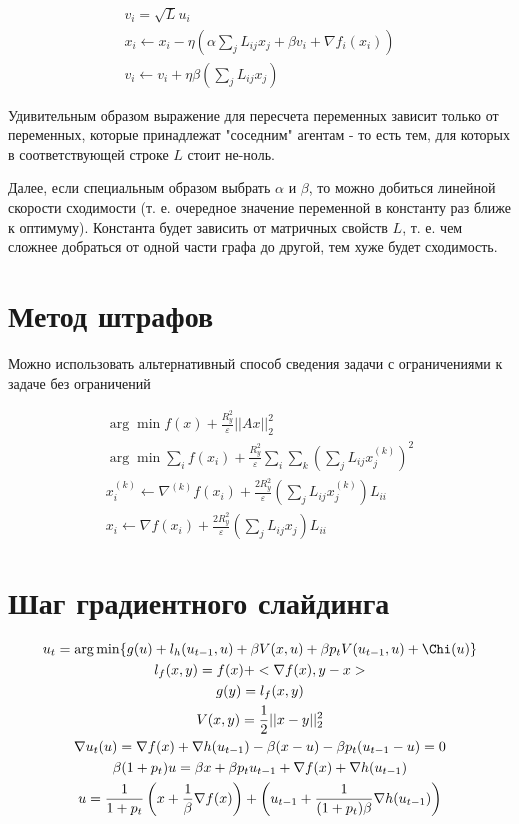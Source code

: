 \documentclass[a4paper, 10pt]{article}
\begin{document}
\begin{gather}
    v_i = \sqrt{L} u_i \\
    x_{i} \leftarrow x_i - \eta(\alpha\sum_{j} L_{ij} x_{j} + \beta v_i + \nabla f_i(x_i)) \\
    v_{i} \leftarrow v_i + \eta\beta(\sum_j L_{ij}x_j)
\end{gather}


Удивительным образом выражение для пересчета переменных зависит только от переменных, которые принадлежат "соседним" агентам - то есть тем, для которых в соответствующей строке $L$ стоит не-ноль.

Далее, если специальным образом выбрать $\alpha$ и $\beta$, то можно добиться линейной скорости сходимости (т. е. очередное значение переменной в константу раз ближе к оптимуму). Константа будет зависить от матричных свойств $L$, т. е. чем сложнее добраться от одной части графа до другой, тем хуже будет сходимость.

\section{Метод штрафов}

Можно использовать альтернативный способ сведения задачи с ограничениями к задаче без ограничений

\begin{gather}
    \arg \min f(x) + \frac{R_y^2}{\varepsilon} ||Ax||^2_2 \\ 
    \arg \min \sum_i f(x_i) + \frac{R_y^2}{\varepsilon} \sum_i \sum_k \left(\sum_j L_{ij} x_j^{(k)}\right)^2 \\ 
    x_i^{(k)} \leftarrow \nabla^{(k)} f(x_i) + \frac{2R_y^2}{\varepsilon} 
        \left(\sum_j L_{ij} x_j^{(k)} \right)L_{ii} \\
    x_i \leftarrow \nabla f(x_i) + \frac{2R_y^2}{\varepsilon} 
        \left(\sum_j L_{ij} x_j \right)L_{ii}
\end{gather}

\section{Шаг градиентного слайдинга}
\begin{gather}
    u_t  = \arg \min \{g(u) + l_h(u_{t-1}, u) + \beta V(x, u) + 
    \beta p_t V(u_{t-1}, u) + \Chi(u) \} \\
    l_f(x,y) = f(x) + <\nabla f(x), y-x> \\
    g(y) = l_f(x, y) \\
    V(x, y) = \frac{1}{2} ||x-y||_2^2 \\
    \nabla u_t(u) = \nabla f(x) + \nabla h(u_{t-1}) - \beta (x - u) - \beta p_t (u_{t-1} - u) = 0 \\
    \beta (1 + p_t) u = \beta x + \beta p_t u_{t-1} + \nabla f(x) + \nabla h(u_{t-1}) \\
    u =  
            \frac{1}{1 + p_t} \left(x + \frac{1}{\beta} \nabla f(x) \right) + 
            \left( u_{t-1} + \frac{1}{(1+p_t)\beta} \nabla h(u_{t-1})  \right) 
\end{gather}
\end{document}
